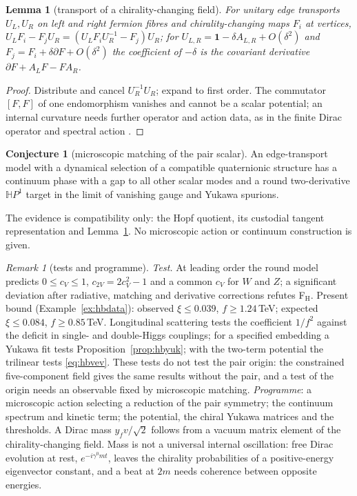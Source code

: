 \documentclass[aps,pra,onecolumn,superscriptaddress,nofootinbib,10pt]{revtex4-2}
\newtheorem{lemma}[theorem]{Lemma}
\theoremstyle{definition}
\newtheorem{conjecture}[theorem]{Conjecture}
\theoremstyle{remark}
\newtheorem{remark}[theorem]{Remark}
\newcommand{\HH}{\mathbb{H}}
\begin{document}
\begin{lemma}[transport of a chirality-changing field]\label{lem:hbtransport}
For unitary edge transports $U_L,U_R$ on left and right fermion fibres and chirality-changing maps $F_i$ at
vertices, $U_LF_i-F_jU_R=(U_LF_iU_R^{-1}-F_j)U_R$; for $U_{L,R}=\mathbf1-\delta A_{L,R}+O(\delta^2)$ and $F_j=F_i+\delta\partial F+O(\delta^2)$ the coefficient of $-\delta$
is the covariant derivative $\partial F+A_LF-FA_R$.
\end{lemma}
\begin{proof}
Distribute and cancel $U_R^{-1}U_R$; expand to first order.  The commutator $[F,F]$ of one endomorphism vanishes and
cannot be a scalar potential; an internal curvature needs further operator and action data, as in the
finite Dirac operator and spectral action \cite{n7:Connes,n7:CC,n7:CC12}.
\end{proof}

\begin{conjecture}[microscopic matching of the pair scalar]\label{conj:hbmicro}
An edge-transport model with a dynamical selection of a compatible quaternionic structure has a
continuum phase with a gap to all other scalar modes and a round two-derivative $\HH P^1$ target in the limit
of vanishing gauge and Yukawa spurions.
\end{conjecture}
\noindent The evidence is compatibility only: the Hopf quotient, its custodial tangent representation and
Lemma~\ref{lem:hbtransport}.  No microscopic action or continuum construction is given.

\begin{remark}[tests and programme]\label{rem:hbtests}
\emph{Test.}  At leading order the round model predicts $0\le c_V\le1$, $c_{2V}=2c_V^2-1$ and a common $c_V$ for $W$ and $Z$; a
significant deviation after radiative, matching and derivative corrections refutes F$_{\mathrm H}$.  Present bound
(Example~\ref{ex:hbdata}): observed $\xi\le0.039$, $f\ge1.24$\,TeV; expected $\xi\le0.084$, $f\ge0.85$\,TeV.  Longitudinal scattering tests the coefficient $1/f^2$ against the
deficit in single- and double-Higgs couplings; for a specified embedding a Yukawa fit tests
Proposition~\ref{prop:hbyuk}; with the two-term potential the trilinear tests \eqref{eq:hbvev}.  These tests do not test the
pair origin: the constrained five-component field gives the same results without the pair, and a test of
the origin needs an observable fixed by microscopic matching.  \emph{Programme}: a microscopic action selecting
a reduction of the pair symmetry; the continuum spectrum and kinetic term; the potential, the chiral
Yukawa matrices and the thresholds.  A Dirac mass $y_fv/\sqrt2$ follows from a vacuum matrix element of the
chirality-changing field.  Mass is not a universal internal oscillation: free Dirac evolution at rest,
$e^{-i\gamma^0mt}$, leaves the chirality probabilities of a positive-energy eigenvector constant, and a beat at $2m$
needs coherence between opposite energies.
\end{remark}
\end{document}
